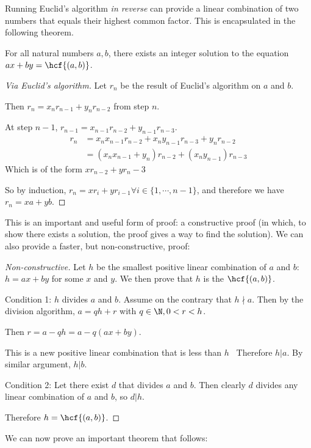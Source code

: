 \documentclass[../Main.tex]{subfiles}
\begin{document}
Running Euclid's algorithm \textit{in reverse} can provide a linear combination of two numbers that equals their highest common factor. This is encapsulated in the following theorem.
\begin{theorem}
    For all natural numbers $a, b$, there exists an integer solution to the equation $ax + by = \hcf{(a, b)}$.
    \label{thmLinearComboHCF}
\end{theorem}
\begin{proof}[Via Euclid's algorithm]
    Let $r_n$ be the result of Euclid's algorithm on $a$ and $b$.\par
    Then $r_n = x_n r_{n-1} + y_n r_{n-2}$ from step $n$.\par
    At step $n-1$, $r_{n-1}= x_{n-1} r_{n-2} + y_{n-1} r_{n-3}$.
    \begin{align*}
        r_n &= x_n x_{n-1} r_{n-2} + x_n y_{n-1} r_{n-3} + y_n r_{n-2} \\
        &= \left(x_n x_{n-1} + y_n\right)r_{n-2} + \left(x_n y_{n-1}\right)r_{n-3}
    \end{align*}
    Which is of the form $x r_{n-2} + y {r_n-3}$\par
    So by induction, $r_n = x r_i + y r_{i-1} \forall i \in \{1, \cdots, n-1\}$, and therefore we have $r_n = x a + y b$.
\end{proof}
This is an important and useful form of proof: a constructive proof (in which, to show there exists a solution, the proof gives a way to find the solution). We can also provide a faster, but non-constructive, proof:
\begin{proof}[Non-constructive]
    Let $h$ be the smallest positive linear combination of $a$ and $b$: $h = a x + b y$ for some $x$ and $y$. We then prove that $h$ is the $\hcf{(a, b)}$.\par
    Condition 1: $h$ divides $a$ and $b$. Assume on the contrary that $h \nmid a$. Then by the division algorithm, $a = qh + r$ with $q \in \N, 0 < r < h$.\par
    Then $r = a - qh = a - q(a x + b y)$.\par
    This is a new positive linear combination that is less than $h$ \contradiction~Therefore $h | a$. By similar argument, $h | b$.\par
    Condition 2: Let there exist $d$ that divides $a$ and $b$. Then clearly $d$ divides any linear combination of $a$ and $b$, so $d | h$.\par
    Therefore $h = \hcf{(a, b)}$.
\end{proof}
We can now prove an important theorem that follows:
\end{document}

